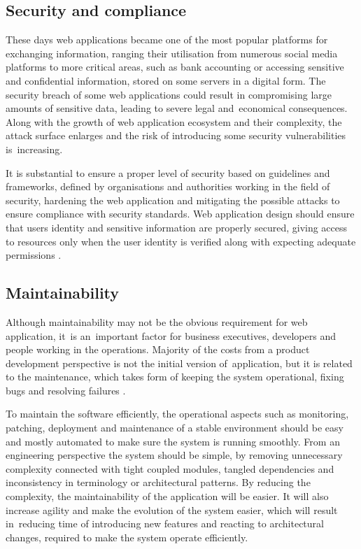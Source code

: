 \subsection{Security and compliance}

These days web applications became one of the most popular platforms for exchanging information, ranging their utilisation from numerous social media platforms to more critical areas, such as bank accounting or accessing sensitive and confidential information, stored on some servers in a digital form. The security breach of some web applications could result in compromising large amounts of sensitive data, leading to severe legal and~economical consequences. Along with the growth of web application ecosystem and their complexity, the attack surface enlarges and the risk of introducing some security vulnerabilities is~increasing.

It is substantial to ensure a proper level of security based on guidelines and frameworks, defined by organisations and authorities working in the field of security, hardening the web application and mitigating the possible attacks to ensure compliance with security standards. Web application design should ensure that users identity and sensitive information are properly secured, giving access to resources only when the user identity is verified along with expecting adequate permissions \cite{ASurveyonWebApplicationSecurity}.

\subsection{Maintainability}

Although maintainability may not be the obvious requirement for web application, it~is an~important factor for business executives, developers and people working in the operations. Majority of the costs from a product development perspective is not the initial version of~application, but it is related to the maintenance, which takes form of keeping the system operational, fixing bugs and resolving failures \cite{DesignDataIntensiveApplications}.

To maintain the software efficiently, the operational aspects such as monitoring, patching, deployment and maintenance of a stable environment should be easy and mostly automated to make sure the system is running smoothly. From an engineering perspective the system should be simple, by removing unnecessary complexity connected with tight coupled modules, tangled dependencies and inconsistency in terminology or architectural patterns. By reducing the complexity, the maintainability of the application will be easier. It will also increase agility and make the evolution of the system easier, which will result in~reducing time of introducing new features and reacting to architectural changes, required to make the system operate efficiently.


